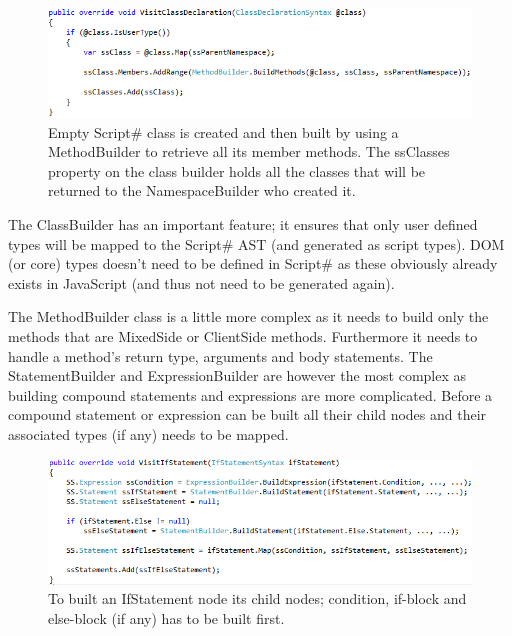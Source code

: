 	\begin{figure}[H]
		\begin{center}
			\centerline{\includegraphics[width=16cm]{resources/images/VisitClassDeclaration.png}}
		\end{center}
		\caption{Empty Script\# class is created and then built by using a MethodBuilder to retrieve all its member methods. The ssClasses property on the class builder holds all the classes that will be returned to the NamespaceBuilder who created it.}
		\label{visitClassDeclaration}
	\end{figure}

	The ClassBuilder has an important feature; it ensures that only user defined types will be mapped to the Script\# AST (and generated as script types). DOM (or core) types doesn’t need to be defined in Script\# as these obviously already exists in JavaScript (and thus not need to be generated again).

	The MethodBuilder class is a little more complex as it needs to build only the methods that are MixedSide or ClientSide methods. Furthermore it needs to handle a method’s return type, arguments and body statements. The StatementBuilder and ExpressionBuilder are however the most complex as building compound statements and expressions are more complicated. Before a compound statement or expression can be built all their child nodes and their associated types (if any) needs to be mapped.

	\begin{figure}[H]
		\begin{center}
			\centerline{\includegraphics[width=16cm]{resources/images/VisitIfStatement.png}}
		\end{center}
		\caption{To built an IfStatement node its child nodes; condition, if-block and else-block (if any) has to be built first.}
		\label{visitIfStatement}
	\end{figure}

